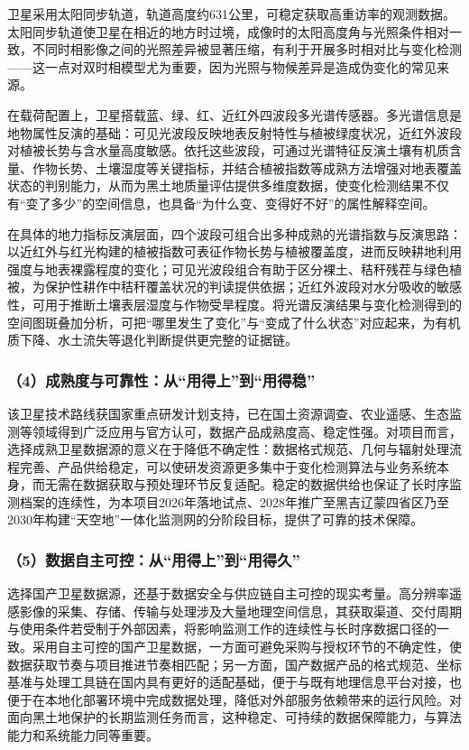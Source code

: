 卫星采用太阳同步轨道，轨道高度约631公里，可稳定获取高重访率的观测数据。太阳同步轨道使卫星在相近的地方时过境，成像时的太阳高度角与光照条件相对一致，不同时相影像之间的光照差异被显著压缩，有利于开展多时相对比与变化检测——这一点对双时相模型尤为重要，因为光照与物候差异是造成伪变化的常见来源。

在载荷配置上，卫星搭载蓝、绿、红、近红外四波段多光谱传感器。多光谱信息是地物属性反演的基础：可见光波段反映地表反射特性与植被绿度状况，近红外波段对植被长势与含水量高度敏感。依托这些波段，可通过光谱特征反演土壤有机质含量、作物长势、土壤湿度等关键指标，并结合植被指数等成熟方法增强对地表覆盖状态的判别能力，从而为黑土地质量评估提供多维度数据，使变化检测结果不仅有“变了多少”的空间信息，也具备“为什么变、变得好不好”的属性解释空间。

在具体的地力指标反演层面，四个波段可组合出多种成熟的光谱指数与反演思路：以近红外与红光构建的植被指数可表征作物长势与植被覆盖度，进而反映耕地利用强度与地表裸露程度的变化；可见光波段组合有助于区分裸土、秸秆残茬与绿色植被，为保护性耕作中秸秆覆盖状况的判读提供依据；近红外波段对水分吸收的敏感性，可用于推断土壤表层湿度与作物受旱程度。将光谱反演结果与变化检测得到的空间图斑叠加分析，可把“哪里发生了变化”与“变成了什么状态”对应起来，为有机质下降、水土流失等退化判断提供更完整的证据链。

\subsubsection{（4）成熟度与可靠性：从“用得上”到“用得稳”}

该卫星技术路线获国家重点研发计划支持，已在国土资源调查、农业遥感、生态监测等领域得到广泛应用与官方认可，数据产品成熟度高、稳定性强。对项目而言，选择成熟卫星数据源的意义在于降低不确定性：数据格式规范、几何与辐射处理流程完善、产品供给稳定，可以使研发资源更多集中于变化检测算法与业务系统本身，而无需在数据获取与预处理环节反复适配。稳定的数据供给也保证了长时序监测档案的连续性，为本项目2026年落地试点、2028年推广至黑吉辽蒙四省区乃至2030年构建“天空地”一体化监测网的分阶段目标，提供了可靠的技术保障。

\subsubsection{（5）数据自主可控：从“用得上”到“用得久”}

选择国产卫星数据源，还基于数据安全与供应链自主可控的现实考量。高分辨率遥感影像的采集、存储、传输与处理涉及大量地理空间信息，其获取渠道、交付周期与使用条件若受制于外部因素，将影响监测工作的连续性与长时序数据口径的一致。采用自主可控的国产卫星数据，一方面可避免采购与授权环节的不确定性，使数据获取节奏与项目推进节奏相匹配；另一方面，国产数据产品的格式规范、坐标基准与处理工具链在国内具有更好的适配基础，便于与既有地理信息平台对接，也便于在本地化部署环境中完成数据处理，降低对外部服务依赖带来的运行风险。对面向黑土地保护的长期监测任务而言，这种稳定、可持续的数据保障能力，与算法能力和系统能力同等重要。
